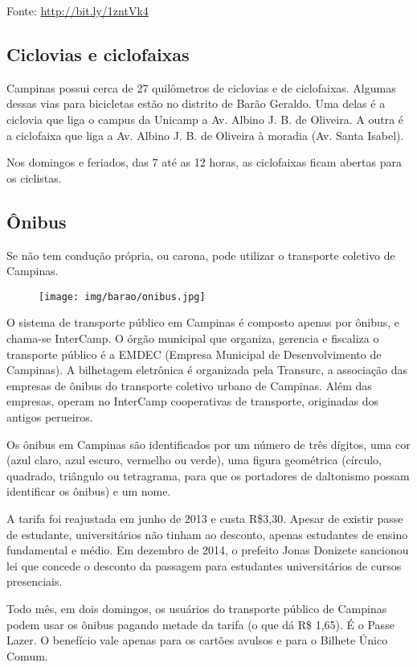 Fonte:
\url{http://bit.ly/1zntVk4}

\subsection{Ciclovias e ciclofaixas}

Campinas possui cerca de 27 quilômetros de ciclovias e de ciclofaixas. Algumas
dessas vias para bicicletas estão no distrito de Barão Geraldo. Uma delas é a
ciclovia que liga o campus da Unicamp a Av. Albino J. B. de Oliveira. A outra é
a ciclofaixa que liga a Av. Albino J. B. de Oliveira à moradia (Av. Santa
Isabel).

Nos domingos e feriados, das 7 até as 12 horas, as ciclofaixas ficam abertas
para os ciclistas.

\subsection{Ônibus}

Se não tem condução própria, ou carona, pode utilizar o transporte coletivo de
Campinas.

\begin{figure}[h!]  \centering
    \texttt{[image: img/barao/onibus.jpg]}
\end{figure}

O sistema de transporte público em Campinas é composto apenas por ônibus, e
chama-se InterCamp. O órgão municipal que organiza, gerencia e fiscaliza o
transporte público é a EMDEC (Empresa Municipal de Desenvolvimento de Campinas).
A bilhetagem eletrônica é organizada pela Transurc, a associação das empresas de
ônibus do transporte coletivo urbano de Campinas. Além das empresas, operam no
InterCamp cooperativas de transporte, originadas dos antigos perueiros.

Os ônibus em Campinas são identificados por um número de três dígitos, uma cor
(azul claro, azul escuro, vermelho ou verde), uma figura geométrica (círculo,
quadrado, triângulo ou tetragrama, para que os portadores de daltonismo possam
identificar os ônibus) e um nome.

A tarifa foi reajustada em junho de 2013 e custa R\$3,30. Apesar de existir
passe de estudante, universitários não tinham ao desconto, apenas estudantes de
ensino fundamental e médio. Em dezembro de 2014, o prefeito Jonas Donizete
sancionou lei que concede o desconto da passagem para estudantes universitários
de cursos presenciais.

Todo mês, em dois domingos, os usuários do transporte público de Campinas podem
usar os ônibus pagando metade da tarifa (o que dá R\$ 1,65). É o Passe Lazer. O
benefício vale apenas para os cartões avulsos e para o Bilhete Único Comum.

